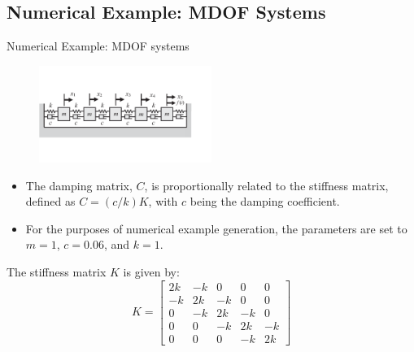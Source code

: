 \documentclass{beamer}
\begin{document}
\subsection{Numerical Example: MDOF Systems}
\begin{frame}{Numerical Example: MDOF systems}
  \begin{figure}[htpb]
    \centering
    \includegraphics[width=0.5\textwidth]{Five_degree of_freedom_system.pdf}
  \end{figure}

  \begin{itemize}
    \item  The damping matrix, \( C \), is proportionally related to the stiffness matrix, defined as \( C = (c/k)K \), with \( c \) being the damping coefficient.
    \item  For the purposes of numerical example generation, the parameters are set to \( m = 1 \), \( c = 0.06 \), and \( k = 1 \). 
  \end{itemize}
  

    The stiffness matrix \( K \) is given by:
    \[
      K = \begin{bmatrix}
      2k & -k & 0 & 0 & 0 \\
      -k & 2k & -k & 0 & 0 \\
      0 & -k & 2k & -k & 0 \\
      0 & 0 & -k & 2k & -k \\
      0 & 0 & 0 & -k & 2k
      \end{bmatrix}
      \]
\end{frame}
\end{document}
